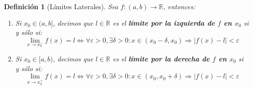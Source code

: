 \documentclass[10pt,a4paper,openright]{book}
\theoremstyle{break}
\newtheorem{defi}{Definición}[chapter]
\begin{document}
\begin{defi}[Límites Laterales]
Sea $f: (a,b)\longrightarrow \mathbb R$, entonces:
\begin{enumerate}
\item Si $x_0\in (a,b]$, decimos que $l\in \mathbb R$ es el \textbf{límite por la izquierda de $f$ en $x_0$} si y sólo si:
$$\lim_{x\rightarrow x_0^-}f(x)=l\Leftrightarrow \forall \varepsilon>0, \exists \delta>0: x\in (x_0-\delta, x_0)\Rightarrow |f(x)-l|<\varepsilon$$

\item Si $x_0\in [a,b)$, decimos que $l\in \mathbb R$ es el \textbf{límite por la derecha de $f$ en $x_0$} si y sólo si:
$$\lim_{x\rightarrow x_0^+}f(x)=l\Leftrightarrow \forall \varepsilon>0, \exists \delta>0: x\in (x_0, x_0+\delta)\Rightarrow |f(x)-l|<\varepsilon$$
\end{enumerate}
\end{defi}
\end{document}
